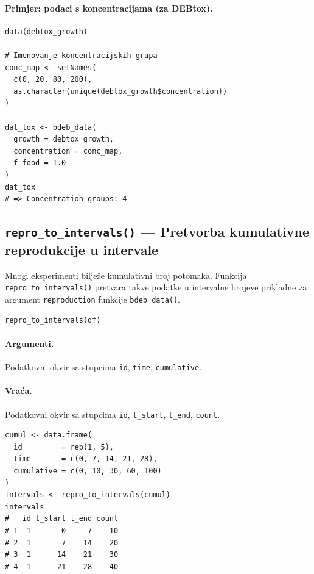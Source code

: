 \documentclass[11pt,a4paper]{article}
\newcommand{\fn}[1]{\texttt{#1()}}
\newcommand{\code}[1]{\texttt{#1}}
\begin{document}
\paragraph{Primjer: podaci s koncentracijama (za DEBtox).}
\begin{lstlisting}
data(debtox_growth)

# Imenovanje koncentracijskih grupa
conc_map <- setNames(
  c(0, 20, 80, 200),
  as.character(unique(debtox_growth$concentration))
)

dat_tox <- bdeb_data(
  growth = debtox_growth,
  concentration = conc_map,
  f_food = 1.0
)
dat_tox
# => Concentration groups: 4
\end{lstlisting}


\subsection{\fn{repro\_to\_intervals} --- Pretvorba kumulativne reprodukcije u intervale}

Mnogi eksperimenti bilježe kumulativni broj potomaka.  Funkcija
\fn{repro\_to\_intervals} pretvara takve podatke u intervalne brojeve
prikladne za argument \code{reproduction} funkcije \fn{bdeb\_data}.

\begin{lstlisting}
repro_to_intervals(df)
\end{lstlisting}

\paragraph{Argumenti.}
\begin{description}[nosep,leftmargin=2.5cm]
  \item[\code{df}] Podatkovni okvir sa stupcima \code{id}, \code{time},
    \code{cumulative}.
\end{description}

\paragraph{Vraća.} Podatkovni okvir sa stupcima \code{id}, \code{t\_start},
\code{t\_end}, \code{count}.

\begin{lstlisting}
cumul <- data.frame(
  id         = rep(1, 5),
  time       = c(0, 7, 14, 21, 28),
  cumulative = c(0, 10, 30, 60, 100)
)
intervals <- repro_to_intervals(cumul)
intervals
#   id t_start t_end count
# 1  1       0     7    10
# 2  1       7    14    20
# 3  1      14    21    30
# 4  1      21    28    40
\end{lstlisting}
\end{document}

